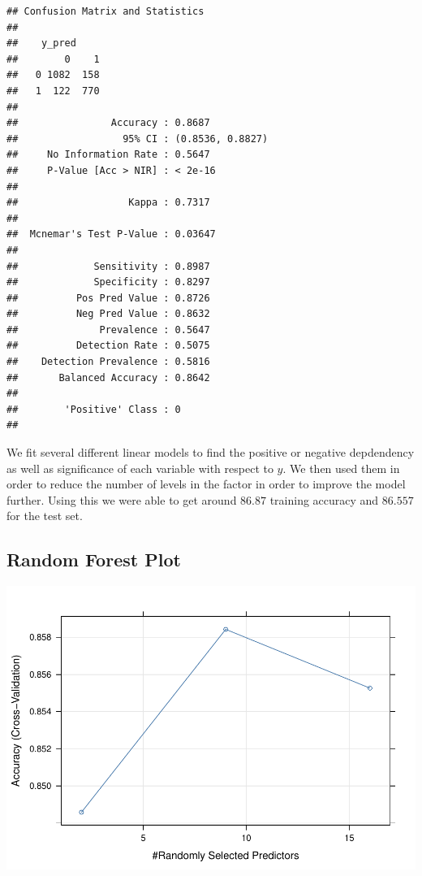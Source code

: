 \documentclass[
]{article}
\begin{document}
\begin{verbatim}
## Confusion Matrix and Statistics
## 
##    y_pred
##        0    1
##   0 1082  158
##   1  122  770
##                                           
##                Accuracy : 0.8687          
##                  95% CI : (0.8536, 0.8827)
##     No Information Rate : 0.5647          
##     P-Value [Acc > NIR] : < 2e-16         
##                                           
##                   Kappa : 0.7317          
##                                           
##  Mcnemar's Test P-Value : 0.03647         
##                                           
##             Sensitivity : 0.8987          
##             Specificity : 0.8297          
##          Pos Pred Value : 0.8726          
##          Neg Pred Value : 0.8632          
##              Prevalence : 0.5647          
##          Detection Rate : 0.5075          
##    Detection Prevalence : 0.5816          
##       Balanced Accuracy : 0.8642          
##                                           
##        'Positive' Class : 0               
## 
\end{verbatim}

We fit several different linear models to find the positive or negative
depdendency as well as significance of each variable with respect to
\(y\). We then used them in order to reduce the number of levels in the
factor in order to improve the model further. Using this we were able to
get around \(86.87%
\) training accuracy and \(86.557%
\) for the test set.

\subsection{Random Forest Plot}

\begin{center}\includegraphics[width=0.75\linewidth]{report_files/figure-latex/Accuracy-1} \end{center}
\end{document}
